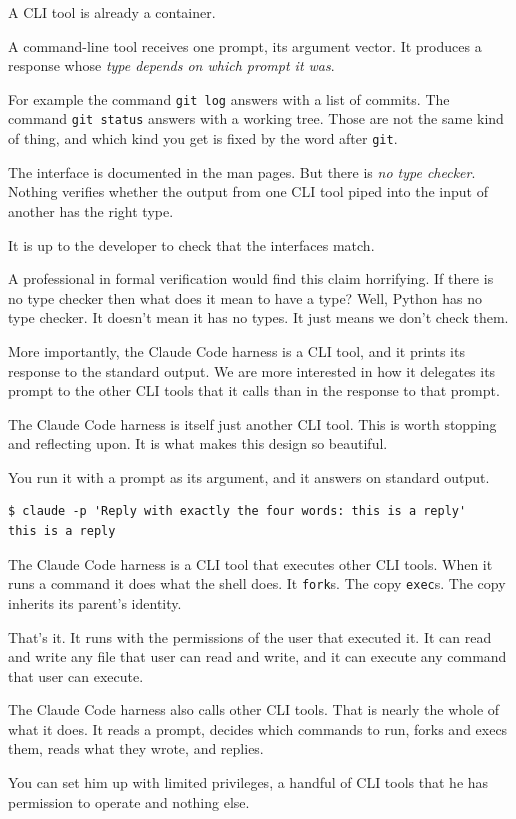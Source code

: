 \documentclass[11pt,a4paper]{article}
\begin{document}
\begin{sectionbox}
A CLI tool is already a container.

A command-line tool receives one prompt, its argument vector. It produces a response whose
\emph{type depends on which prompt it was}.

For example the command \texttt{git log} answers with a list of commits. The command
\texttt{git status} answers with a working tree. Those are not the same kind of thing, and which
kind you get is fixed by the word after \texttt{git}.

The interface is documented in the man pages. But there is \emph{no type checker}. Nothing verifies
whether the output from one CLI tool piped into the input of another has the right type.

It is up to the developer to check that the interfaces match.

A professional in formal verification would find this claim horrifying. If there is no type
checker then what does it mean to have a type? Well, Python has no type checker. It doesn't mean
it has no types. It just means we don't check them.

More importantly, the Claude Code harness is a CLI tool, and it prints its response to the
standard output. We are more interested in how it delegates its prompt to the other CLI tools
that it calls than in the response to that prompt.

\label{sec:harness}

The Claude Code harness is itself just another CLI tool. This is worth stopping and reflecting
upon. It is what makes this design so beautiful.

You run it with a prompt as its argument, and it answers on standard output.

\begin{lstlisting}[language=SH]
$ claude -p 'Reply with exactly the four words: this is a reply'
this is a reply
\end{lstlisting}

The Claude Code harness is a CLI tool that executes other CLI tools. When it runs a command it does
what the shell does. It \texttt{fork}s. The copy \texttt{exec}s. The copy inherits its parent's identity.

That's it. It runs with the permissions of the user that executed it. It can read and write any
file that user can read and write, and it can execute any command that user can execute.

The Claude Code harness also calls other CLI tools. That is nearly the whole of what it does. It
reads a prompt, decides which commands to run, forks and execs them, reads what they wrote, and
replies.

You can set him up with limited privileges, a handful of CLI tools that he has permission to
operate and nothing else.
\end{sectionbox}
\end{document}
